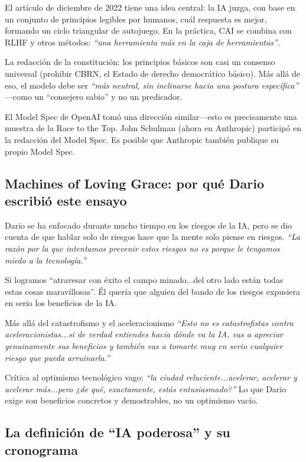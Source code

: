 \documentclass[a4paper]{article}
\begin{document}
El artículo de diciembre de 2022 tiene una idea central: la IA juzga, con base en un conjunto de principios legibles por humanos, cuál respuesta es mejor, formando un ciclo triangular de autojuego. En la práctica, CAI se combina con RLHF y otros métodos: \textit{``una herramienta más en la caja de herramientas''}.

La redacción de la constitución: los principios básicos son casi un consenso universal (prohibir CBRN, el Estado de derecho democrático básico). Más allá de eso, el modelo debe ser \textit{``más neutral, sin inclinarse hacia una postura específica''} —como un ``consejero sabio'' y no un predicador.

El Model Spec de OpenAI tomó una dirección similar—esto es precisamente una muestra de la Race to the Top. John Schulman (ahora en Anthropic) participó en la redacción del Model Spec. Es posible que Anthropic también publique su propio Model Spec.

\subsection{Machines of Loving Grace: por qué Dario escribió este ensayo}

Dario se ha enfocado durante mucho tiempo en los riesgos de la IA, pero se dio cuenta de que hablar solo de riesgos hace que la mente solo piense en riesgos. \textit{``La razón por la que intentamos prevenir estos riesgos no es porque le tengamos miedo a la tecnología.''}

Si logramos ``atravesar con éxito el campo minado...del otro lado están todas estas cosas maravillosas''. Él quería que alguien del bando de los riesgos expusiera en serio los beneficios de la IA.

\begin{importantbox}{Más allá del catastrofismo y el aceleracionismo}
\textit{``Esto no es catastrofistas contra aceleracionistas...si de verdad entiendes hacia dónde va la IA, vas a apreciar genuinamente sus beneficios y también vas a tomarte muy en serio cualquier riesgo que pueda arruinarla.''}

Crítica al optimismo tecnológico vago: \textit{``la ciudad reluciente...acelerar, acelerar y acelerar más...pero ¿de qué, exactamente, estás entusiasmado?''} Lo que Dario exige son beneficios concretos y demostrables, no un optimismo vacío.
\end{importantbox}

\subsection{La definición de ``IA poderosa'' y su cronograma}
\end{document}
